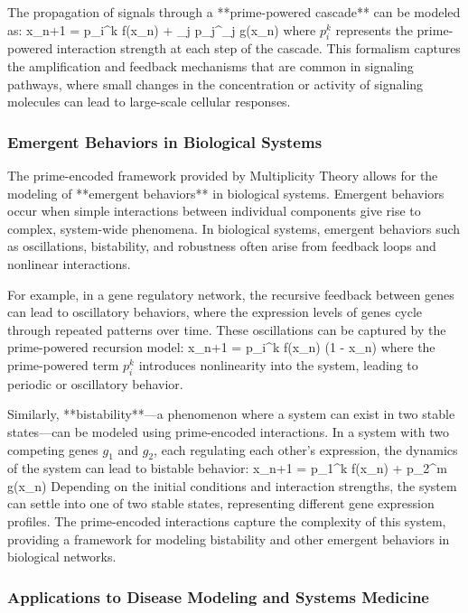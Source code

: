 \documentclass[12pt]{article}
\begin{document}
The propagation of signals through a **prime-powered cascade** can be modeled as:
\]
x_{n+1} = p_i^k f(x_n) + \sum_j p_j^{\gamma_j} g(x_n)
\]
where \( p_i^k \) represents the prime-powered interaction strength at each step of the cascade. This formalism captures the amplification and feedback mechanisms that are common in signaling pathways, where small changes in the concentration or activity of signaling molecules can lead to large-scale cellular responses.

\subsubsection{Emergent Behaviors in Biological Systems}

The prime-encoded framework provided by Multiplicity Theory allows for the modeling of **emergent behaviors** in biological systems. Emergent behaviors occur when simple interactions between individual components give rise to complex, system-wide phenomena. In biological systems, emergent behaviors such as oscillations, bistability, and robustness often arise from feedback loops and nonlinear interactions.

For example, in a gene regulatory network, the recursive feedback between genes can lead to oscillatory behaviors, where the expression levels of genes cycle through repeated patterns over time. These oscillations can be captured by the prime-powered recursion model:
\]
x_{n+1} = p_i^k f(x_n) (1 - x_n)
\]
where the prime-powered term \( p_i^k \) introduces nonlinearity into the system, leading to periodic or oscillatory behavior.

Similarly, **bistability**—a phenomenon where a system can exist in two stable states—can be modeled using prime-encoded interactions. In a system with two competing genes \( g_1 \) and \( g_2 \), each regulating each other's expression, the dynamics of the system can lead to bistable behavior:
\]
x_{n+1} = p_1^k f(x_n) + p_2^m g(x_n)
\]
Depending on the initial conditions and interaction strengths, the system can settle into one of two stable states, representing different gene expression profiles. The prime-encoded interactions capture the complexity of this system, providing a framework for modeling bistability and other emergent behaviors in biological networks.

\subsubsection{Applications to Disease Modeling and Systems Medicine}
\end{document}
